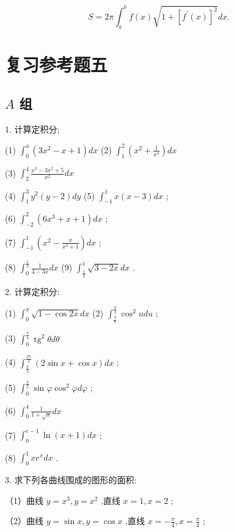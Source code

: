 \documentclass[lang=cn,newtx,10pt,scheme=chinese]{elegantbook}
\begin{document}
\[
S = {2\pi }{\int }_{a}^{b}f\left( x\right) \sqrt{1 + {\left\lbrack {f}^{\prime }\left( x\right) \right\rbrack }^{2}}{dx}.
\]

\chapter*{复习参考题五}

\section*{\(A\) 组}

1. 计算定积分;

(1) \({\int }_{0}^{a}\left( {3{x}^{2} - x + 1}\right) {dx}\) (2) \({\int }_{1}^{2}\left( {{x}^{2} + \frac{1}{{x}^{4}}}\right) {dx}\)

(3) \({\int }_{2}^{4}\frac{{x}^{3} - 3{x}^{2} + 5}{{x}^{2}}{dx}\)

(4) \({\int }_{1}^{3}{y}^{2}\left( {y - 2}\right) {dy}\) (5) \({\int }_{-1}^{1}x\left( {x - 3}\right) {dx}\) ;

(6) \({\int }_{-2}^{2}\left( {6{x}^{3} + x + 1}\right) {dx}\) ;

(7) \({\int }_{-1}^{1}\left( {{x}^{2} - \frac{x}{{x}^{2} + 1}}\right) {dx}\) ;

(8) \({\int }_{0}^{\frac{1}{3}}\frac{1}{4 - {3x}}{dx}\) (9) \({\int }_{\frac{1}{2}}^{1}\sqrt{3 - {2x}}{dx}\) .

2. 计算定积分:

(1) \({\int }_{0}^{\pi }\sqrt{1 - \cos {2x}}{dx}\) (2) \({\int }_{\frac{\pi }{6}}^{\frac{\pi }{2}}{\cos }^{2}{udu}\) ;

(3) \({\int }_{0}^{\frac{\pi }{4}}{\operatorname{tg}}^{2}{\theta d\theta }\)

(4) \({\int }_{\frac{\pi }{3}}^{\frac{2\pi }{3}}\left( {2\sin x + \cos x}\right) {dx}\) ;

(5) \({\int }_{0}^{\frac{\pi }{2}}\sin \varphi {\cos }^{2}{\varphi d\varphi }\) ;

(6) \({\int }_{0}^{4}\frac{1}{1 + \sqrt{x}}{dx}\)

(7) \({\int }_{0}^{e - 1}\ln \left( {x + 1}\right) {dx}\) ;

(8) \({\int }_{0}^{1}x{e}^{x}{dx}\) .

3. 求下列各曲线围成的图形的面积:

（1）曲线 \(y = {x}^{3},y = {x}^{2}\) ,直线 \(x = 1,x = 2\) ;

（2）曲线 \(y = \sin x,y = \cos x\) ,直线 \(x = - \frac{\pi }{4},x = \frac{\pi }{4}\) ;
\end{document}
